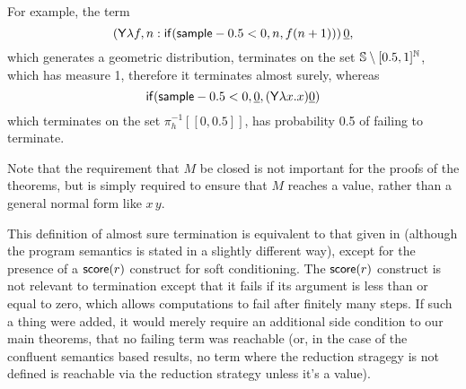\iffalse
\lo{Alternatively, define the \emph{runtime of $M$} to be the random variable 
\[
T_M(s) := 
\begin{cases}
\min \set{n \mid \pi_0(\red^n(M, s)) \textrm{ is a value}} & \hbox{if $\red^\infty(M,s)$ is defined}\\
\infty & \hbox{otherwise}
\end{cases}
\]
Equivalently, we say that $M$ is \emph{almost surely terminating} (AST) if $T_M < \infty$ a.s.; 
and $M$ is \emph{positively almost surely terminating} (PAST) if $\expect{T_M} < \infty$.}
\fi
For example, the term 
\[
(\mathsf{Y} \lambda f, n: \mathsf{if}(\mathsf{sample} - 0.5 < 0, n, f (n+1)) ) \, \underline{0},
\] 
which generates a geometric distribution, terminates on the set ${\mathbb{S}} \setminus [0.5,1]^\mathbb N$, which has measure 1, therefore it terminates almost surely, whereas 
\[
\mathsf{if}(\mathsf{sample} - 0.5 < 0, \underline 0, (\mathsf{Y} \lambda x. x) \underline 0)
\] 
which terminates on the set $\pi_h^{-1}[[0,0.5]]$, has probability 0.5 of failing to terminate.

Note that the requirement that $M$ be closed is not important for the proofs of the theorems, but is simply required to ensure that $M$ reaches a value, rather than a general normal form like $x \, y$.

\begin{remark}
This definition of almost sure termination is equivalent to that given in \citep{MakOPW21} (although the program semantics is stated in a slightly different way), except for the presence of a $\mathsf{score}(r)$ construct for soft conditioning. 
The $\mathsf{score}(r)$ construct is not relevant to termination except that it fails if its argument is less than or equal to zero, which allows computations to fail after finitely many steps. 
If such a thing were added, it would merely require an additional side condition to our main theorems, that no failing term was reachable (or, in the case of the confluent semantics based results, no term where the reduction stragegy is not defined is reachable via the reduction strategy unless it's a value).
\end{remark}

\iffalse
\lo{Your operational semantics does not maintain a record of the current weight of the reduction.
A.s.~termination does depend on $\tscore$: see \cite[\S 4.3]{MakOPW21}\footnote{\url{https://arxiv.org/abs/2004.03924}}.
I think it important to take the behaviour of $\tscore$ into account;
you should do it as a future task.}
\fi
